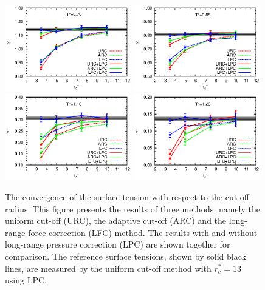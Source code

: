 \documentclass[aps,pre,preprint]{revtex4-1}
\begin{document}
\begin{figure}
  \centering
  \includegraphics[width=0.49\textwidth]{fig/converge.new/tension.t0.70.eps} 
  \includegraphics[width=0.49\textwidth]{fig/converge.new/tension.t0.85.eps} 
  \includegraphics[width=0.49\textwidth]{fig/converge.new/tension.t1.10.eps} 
  \includegraphics[width=0.49\textwidth]{fig/converge.new/tension.t1.20.eps} 
  \caption{The convergence of the surface tension with respect to the
    cut-off radius.  This figure presents the results of three
    methods, namely the uniform cut-off (URC), the adaptive cut-off
    (ARC) and the long-range force correction (LFC) method.  The
    results with and without long-range pressure correction (LPC) are
    shown together for comparison. The reference surface tensions,
    shown by solid black lines, are measured by the uniform cut-off
    method with $r_c^\ast=13$ using LPC.}
  \label{fig:tmp6}
\end{figure}
\end{document}
